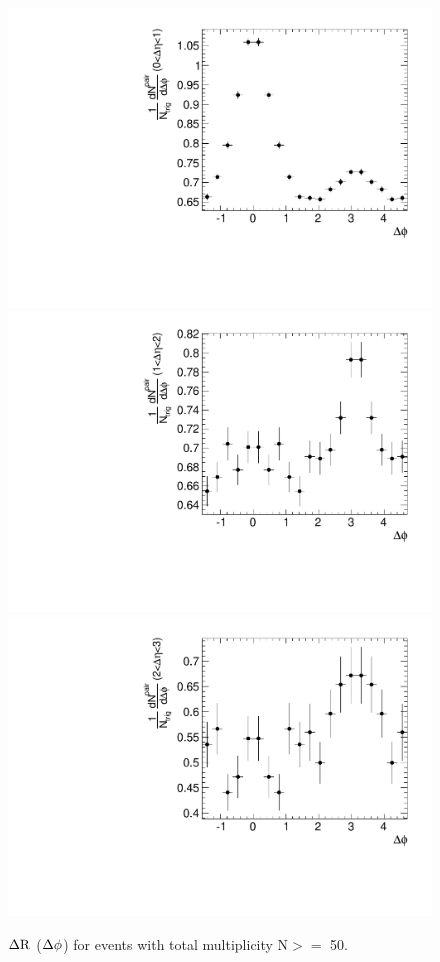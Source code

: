 \begin{figure}[!htb]
\begin{center}
\includegraphics[width=.45\textwidth]{figures/canvasProjection_isBelle1_mult50_eta01.pdf}
\includegraphics[width=.45\textwidth]{figures/canvasProjection_isBelle1_mult50_eta12.pdf}
\includegraphics[width=.45\textwidth]{figures/canvasProjection_isBelle1_mult50_eta23.pdf}
\caption{$\rm \Delta R$ ($\rm \Delta\phi$) for events with total multiplicity N$>=$ 50. }
\label{fig:ProjectionMult50} 
\end{center}
\end{figure}
